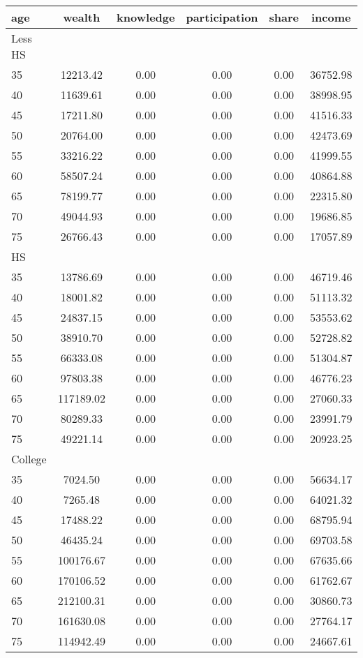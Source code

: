  \begin{tabular}{lccccc}
 \hline \hline
  age & wealth & knowledge & participation & share & income \\
 \hline
 Less HS & & & & & \\
 \hline
35 &  12213.42 &      0.00 &      0.00 &      0.00 &  36752.98 \\ 
40 &  11639.61 &      0.00 &      0.00 &      0.00 &  38998.95 \\ 
45 &  17211.80 &      0.00 &      0.00 &      0.00 &  41516.33 \\ 
50 &  20764.00 &      0.00 &      0.00 &      0.00 &  42473.69 \\ 
55 &  33216.22 &      0.00 &      0.00 &      0.00 &  41999.55 \\ 
60 &  58507.24 &      0.00 &      0.00 &      0.00 &  40864.88 \\ 
65 &  78199.77 &      0.00 &      0.00 &      0.00 &  22315.80 \\ 
70 &  49044.93 &      0.00 &      0.00 &      0.00 &  19686.85 \\ 
75 &  26766.43 &      0.00 &      0.00 &      0.00 &  17057.89 \\ 
 \hline
 HS & & & & & \\
 \hline
35 &  13786.69 &      0.00 &      0.00 &      0.00 &  46719.46 \\ 
40 &  18001.82 &      0.00 &      0.00 &      0.00 &  51113.32 \\ 
45 &  24837.15 &      0.00 &      0.00 &      0.00 &  53553.62 \\ 
50 &  38910.70 &      0.00 &      0.00 &      0.00 &  52728.82 \\ 
55 &  66333.08 &      0.00 &      0.00 &      0.00 &  51304.87 \\ 
60 &  97803.38 &      0.00 &      0.00 &      0.00 &  46776.23 \\ 
65 & 117189.02 &      0.00 &      0.00 &      0.00 &  27060.33 \\ 
70 &  80289.33 &      0.00 &      0.00 &      0.00 &  23991.79 \\ 
75 &  49221.14 &      0.00 &      0.00 &      0.00 &  20923.25 \\ 
 \hline
 College & & & & & \\
 \hline
35 &   7024.50 &      0.00 &      0.00 &      0.00 &  56634.17 \\ 
40 &   7265.48 &      0.00 &      0.00 &      0.00 &  64021.32 \\ 
45 &  17488.22 &      0.00 &      0.00 &      0.00 &  68795.94 \\ 
50 &  46435.24 &      0.00 &      0.00 &      0.00 &  69703.58 \\ 
55 & 100176.67 &      0.00 &      0.00 &      0.00 &  67635.66 \\ 
60 & 170106.52 &      0.00 &      0.00 &      0.00 &  61762.67 \\ 
65 & 212100.31 &      0.00 &      0.00 &      0.00 &  30860.73 \\ 
70 & 161630.08 &      0.00 &      0.00 &      0.00 &  27764.17 \\ 
75 & 114942.49 &      0.00 &      0.00 &      0.00 &  24667.61 \\ 
 \hline \hline
 \end{tabular}
